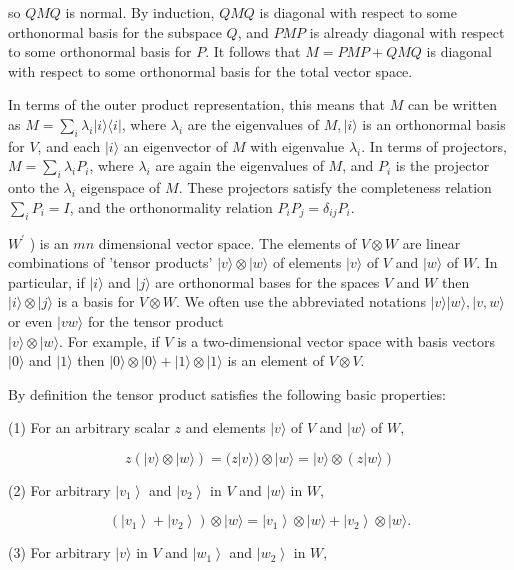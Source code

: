 \documentclass[
	11pt, %
	fleqn, %
	a4paper, %
]{LegrandOrangeBook}
\begin{document}
so $Q M Q$ is normal. By induction, $Q M Q$ is diagonal with respect to some orthonormal basis for the subspace $Q$, and $P M P$ is already diagonal with respect to some orthonormal basis for $P$. It follows that $M=P M P+Q M Q$ is diagonal with respect to some orthonormal basis for the total vector space.

In terms of the outer product representation, this means that $M$ can be written as $M=\sum_{i} \lambda_{i}|i\rangle\langle i|$, where $\lambda_{i}$ are the eigenvalues of $M,|i\rangle$ is an orthonormal basis for $V$, and each $|i\rangle$ an eigenvector of $M$ with eigenvalue $\lambda_{i}$. In terms of projectors, $M=\sum_{i} \lambda_{i} P_{i}$, where $\lambda_{i}$ are again the eigenvalues of $M$, and $P_{i}$ is the projector onto the $\lambda_{i}$ eigenspace of $M$. These projectors satisfy the completeness relation $\sum_{i} P_{i}=I$, and the orthonormality relation $P_{i} P_{j}=\delta_{i j} P_{i}$.

$W^{\prime}$ ) is an $m n$ dimensional vector space. The elements of $V \otimes W$ are linear combinations of 'tensor products' $|v\rangle \otimes|w\rangle$ of elements $|v\rangle$ of $V$ and $|w\rangle$ of $W$. In particular, if $|i\rangle$ and $|j\rangle$ are orthonormal bases for the spaces $V$ and $W$ then $|i\rangle \otimes|j\rangle$ is a basis for $V \otimes W$. We often use the abbreviated notations $|v\rangle|w\rangle,|v, w\rangle$ or even $|v w\rangle$ for the tensor product\\
$|v\rangle \otimes|w\rangle$. For example, if $V$ is a two-dimensional vector space with basis vectors $|0\rangle$ and $|1\rangle$ then $|0\rangle \otimes|0\rangle+|1\rangle \otimes|1\rangle$ is an element of $V \otimes V$.

By definition the tensor product satisfies the following basic properties:

(1) For an arbitrary scalar $z$ and elements $|v\rangle$ of $V$ and $|w\rangle$ of $W$,

$$
z(|v\rangle \otimes|w\rangle)=(z|v\rangle) \otimes|w\rangle=|v\rangle \otimes(z|w\rangle)
$$

(2) For arbitrary $\left|v_{1}\right\rangle$ and $\left|v_{2}\right\rangle$ in $V$ and $|w\rangle$ in $W$,

$$
\left(\left|v_{1}\right\rangle+\left|v_{2}\right\rangle\right) \otimes|w\rangle=\left|v_{1}\right\rangle \otimes|w\rangle+\left|v_{2}\right\rangle \otimes|w\rangle .
$$

(3) For arbitrary $|v\rangle$ in $V$ and $\left|w_{1}\right\rangle$ and $\left|w_{2}\right\rangle$ in $W$,
\end{document}
